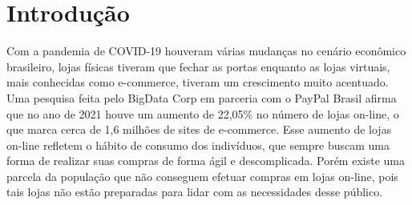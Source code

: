 \newpage
\section{Introdução}
\label{sec:introducao}
 
{Com a pandemia de COVID-19 houveram várias mudanças no cenário econômico brasileiro, lojas físicas tiveram que fechar as portas enquanto as lojas virtuais, mais conhecidas como e-commerce, tiveram um crescimento muito acentuado. Uma pesquisa feita pelo BigData Corp em parceria com o PayPal Brasil \cite{ECOMMERCE} afirma que no ano de 2021 houve um aumento de 22,05\% no número de lojas on-line, o que marca cerca de 1,6 milhões de sites de e-commerce. Esse aumento de lojas on-line refletem o hábito de consumo dos indivíduos, que sempre buscam uma forma de realizar suas compras de forma ágil e descomplicada. Porém existe uma parcela da população que não conseguem efetuar compras em lojas on-line, pois tais lojas não estão preparadas para lidar com as necessidades desse público.


}

